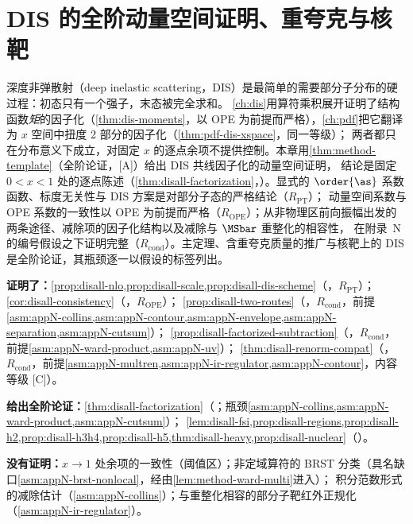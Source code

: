 \chapter{DIS 的全阶动量空间证明、重夸克与核靶}\label{ch:disall}

深度非弹散射（deep inelastic scattering，DIS）是最简单的需要部分子分布的硬过程：初态只有一个强子，末态被完全求和。
\cref{ch:dis}用算符乘积展开证明了结构函数\emph{矩}的因子化（\cref{thm:dis-moments}，以 OPE 为前提而严格），\cref{ch:pdf}把它翻译为 $x$ 空间中扭度 2 部分的因子化（\cref{thm:pdf-dis-xspace}，同一等级）；
两者都只在分布意义下成立，对固定 $x$ 的逐点余项不提供控制。本章用\cref{thm:method-template}（全阶论证，[A]）给出 DIS 共线因子化的动量空间证明，
结论是固定 $0<x<1$ 处的逐点陈述（\cref{thm:disall-factorization}，\tagA）。显式的 $\order{\as}$ 系数函数、标度无关性与 DIS 方案是对部分子态的严格结论（$R_{\mathrm{PT}}$）；
动量空间系数与 OPE 系数的一致性以 OPE 为前提而严格（$R_{\mathrm{OPE}}$）；从非物理区前向振幅出发的两条途径、减除项的因子化结构以及减除与 $\MSbar$ 重整化的相容性，
在附录~N 的编号假设之下证明完整（$R_{\mathrm{cond}}$）。主定理、含重夸克质量的推广与核靶上的 DIS 是全阶论证，其瓶颈逐一以假设的标签列出。

\begin{tcolorbox}[enhanced,breakable,title=本章证明了什么／没有证明什么,fonttitle=\bfseries,
  colback=gray!3!white,colframe=gray!55!black,boxrule=0.6pt,arc=2pt,
  left=5pt,right=5pt,top=3pt,bottom=3pt,before skip=6pt,after skip=6pt]
\textbf{证明了：}\cref{prop:disall-nlo,prop:disall-scale,prop:disall-dis-scheme}（\tagR，$R_{\mathrm{PT}}$）；\cref{cor:disall-consistency}（\tagR，$R_{\mathrm{OPE}}$）；
\cref{prop:disall-two-routes}（\tagR，$R_{\mathrm{cond}}$，前提\cref{asm:appN-collins,asm:appN-contour,asm:appN-envelope,asm:appN-separation,asm:appN-cutsum}）；
\cref{prop:disall-factorized-subtraction}（\tagR，$R_{\mathrm{cond}}$，前提\cref{asm:appN-ward-product,asm:appN-uv}）；
\cref{thm:disall-renorm-compat}（\tagR，$R_{\mathrm{cond}}$，前提\cref{asm:appN-multren,asm:appN-ir-regulator,asm:appN-contour}，内容等级 [C]）。\par
\textbf{给出全阶论证：}\cref{thm:disall-factorization}（\tagA；瓶颈\cref{asm:appN-collins,asm:appN-ward-product,asm:appN-cutsum}）；
\cref{lem:disall-fsi,prop:disall-regions,prop:disall-h2,prop:disall-h3h4,prop:disall-h5,thm:disall-heavy,prop:disall-nuclear}（\tagA）。\par
\textbf{没有证明：}$x\to1$ 处余项的一致性（阈值区）；非定域算符的 BRST 分类（具名缺口\cref{asm:appN-brst-nonlocal}，经由\cref{lem:method-ward-multi}进入）；
积分范数形式的减除估计（\cref{asm:appN-collins}）；与重整化相容的部分子靶红外正规化（\cref{asm:appN-ir-regulator}）。
\end{tcolorbox}

